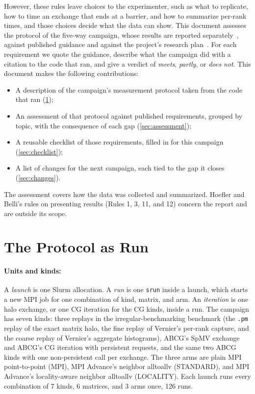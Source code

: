 \documentclass[11pt]{article}
\newcommand{\pmrep}{\texttt{.pm} replay}
\begin{document}
However, these rules leave choices to the experimenter, such as what to replicate, how
to time an exchange that ends at a barrier, and how to summarize per-rank times, and
those choices decide what the data can show. This document assesses the protocol of the
five-way campaign, whose results are reported separately~\cite{fivewayreport}, against
published guidance and against the project's research plan~\cite{researchplan}. For
each requirement we quote the guidance, describe what the campaign did with a citation to
the code that ran, and give a verdict of \emph{meets}, \emph{partly}, or \emph{does not}.
This document makes the following contributions:
\begin{itemize}
\item A description of the campaign's measurement protocol taken from the code that ran
  (\cref{sec:protocol});
\item An assessment of that protocol against published requirements, grouped by topic,
  with the consequence of each gap (\cref{sec:assessment});
\item A reusable checklist of those requirements, filled in for this campaign
  (\cref{sec:checklist});
\item A list of changes for the next campaign, each tied to the gap it closes
  (\cref{sec:changes}).
\end{itemize}
The assessment covers how the data was collected and summarized. Hoefler and Belli's
rules on presenting results (Rules 1, 3, 11, and 12) concern the report and are outside
its scope.

\section{The Protocol as Run}
\label{sec:protocol}

\paragraph{Units and kinds:} A \emph{launch} is one Slurm allocation. A \emph{run} is one
\texttt{srun} inside a launch, which starts a new MPI job for one combination of kind,
matrix, and arm. An \emph{iteration} is one halo exchange, or one CG iteration for the
CG kinds, inside a run. The campaign has seven kinds: three replays in the
irregular-benchmarking benchmark (the \pmrep{} of the exact matrix halo, the fine replay
of Vernier's per-rank capture, and the coarse replay of Vernier's aggregate histograms),
ABCG's SpMV exchange and ABCG's CG iteration with persistent requests, and the same two
ABCG kinds with one non-persistent call per exchange. The three arms are plain MPI
point-to-point (MPI), MPI Advance's neighbor alltoallv (STANDARD), and MPI Advance's
locality-aware neighbor alltoallv (LOCALITY). Each launch runs every combination of 7
kinds, 6 matrices, and 3 arms once, 126 runs.
\end{document}
